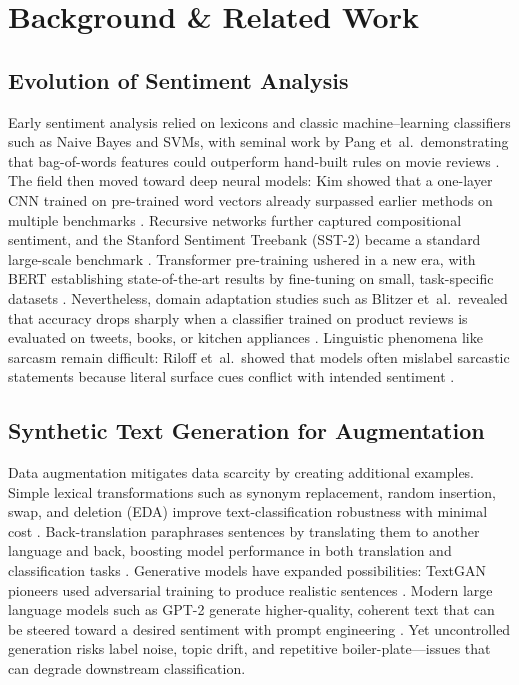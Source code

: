 \documentclass[11pt]{article}
\begin{document}
\section{Background \& Related Work}
\label{sec:background}

\subsection{Evolution of Sentiment Analysis}
Early sentiment analysis relied on lexicons and classic machine–learning
classifiers such as Naive Bayes and SVMs, with seminal work by
Pang et~al.\ demonstrating that bag-of-words features could outperform
hand-built rules on movie reviews \citep{pang2002thumbs}. %
The field then moved toward deep neural models: Kim showed that a
one-layer CNN trained on pre-trained word vectors already surpassed
earlier methods on multiple benchmarks \citep{kim2014cnn}. %
Recursive networks further captured compositional sentiment, and the
Stanford Sentiment Treebank (SST-2) became a standard large-scale
benchmark \citep{socher2013sst}. %
Transformer pre-training ushered in a new era, with BERT establishing
state-of-the-art results by fine-tuning on small, task-specific datasets
\citep{trainlin2019bert}. %
Nevertheless, domain adaptation studies such as Blitzer
et~al.\ revealed that accuracy drops sharply when a classifier trained
on product reviews is evaluated on tweets, books, or kitchen appliances
\citep{blitzer2007domain}. %
Linguistic phenomena like sarcasm remain difficult: Riloff
et~al.\ showed that models often mislabel sarcastic statements because
literal surface cues conflict with intended sentiment
\citep{riloff2013sarcasm}. %

\subsection{Synthetic Text Generation for Augmentation}
Data augmentation mitigates data scarcity by creating additional
examples.  Simple lexical transformations such as synonym replacement,
random insertion, swap, and deletion (EDA) improve text-classification
robustness with minimal cost \citep{wei2019eda}. %
Back-translation paraphrases sentences by translating them to another
language and back, boosting model performance in both translation and
classification tasks \citep{sennrich2016backtrans}. %
Generative models have expanded possibilities: TextGAN pioneers used
adversarial training to produce realistic sentences
\citep{zhang2017textgan}. %
Modern large language models such as GPT-2 generate higher-quality,
coherent text that can be steered toward a desired sentiment with
prompt engineering \citep{radford2019gpt2}. %
Yet uncontrolled generation risks label noise, topic
drift, and repetitive boiler-plate—issues that can degrade downstream
classification.
\end{document}
